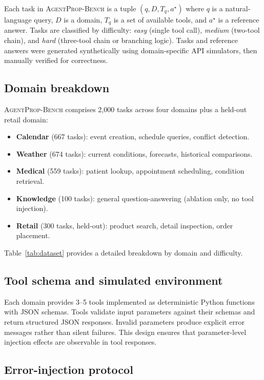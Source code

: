 \documentclass[11pt]{article}
\newcommand{\bench}{\textsc{AgentProp-Bench}\xspace}
\begin{document}
Each task in \bench{} is a tuple $(q, D, T_q, a^\star)$ where $q$ is a
natural-language query, $D$ is a domain, $T_q$ is a set of available
tools, and $a^\star$ is a reference answer.
Tasks are classified by difficulty: \emph{easy} (single tool call),
\emph{medium} (two-tool chain), and \emph{hard} (three-tool chain or
branching logic).
Tasks and reference answers were generated synthetically using
domain-specific API simulators, then manually verified for correctness.

\subsection{Domain breakdown}

\bench{} comprises 2{,}000 tasks across four domains plus a held-out
retail domain:
\begin{itemize}
  \item \textbf{Calendar} (667 tasks): event creation, schedule queries,
    conflict detection.
  \item \textbf{Weather} (674 tasks): current conditions, forecasts,
    historical comparisons.
  \item \textbf{Medical} (559 tasks): patient lookup, appointment
    scheduling, condition retrieval.
  \item \textbf{Knowledge} (100 tasks): general question-answering
    (ablation only, no tool injection).
  \item \textbf{Retail} (300 tasks, held-out): product search, detail
    inspection, order placement.
\end{itemize}

Table~\ref{tab:dataset} provides a detailed breakdown by domain and
difficulty.



\subsection{Tool schema and simulated environment}

Each domain provides 3--5 tools implemented as deterministic Python
functions with JSON schemas.
Tools validate input parameters against their schemas and return
structured JSON responses.
Invalid parameters produce explicit error messages rather than silent
failures.
This design ensures that parameter-level injection effects are
observable in tool responses.

\subsection{Error-injection protocol}
\end{document}
